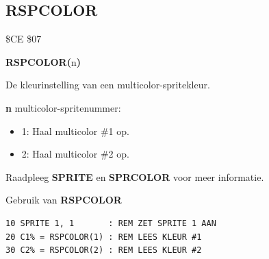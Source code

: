 \subsection{RSPCOLOR}
\begin{description}[leftmargin=2cm,style=nextline]
\item [Token:]    \$CE \$07

\item [Formaat:]   {\bf RSPCOLOR(}n{\bf)}

\item [Retourneert:]  De kleurinstelling van een multicolor-spritekleur.

                  {\bf n} multicolor-spritenummer:

                  \begin{itemize}
                     \item 1: Haal multicolor \#1 op.                     \item 2: Haal multicolor \#2 op.
                  \end{itemize}

\item [Opmerkingen:]  Raadpleeg {\bf SPRITE} en {\bf SPRCOLOR} voor meer informatie.

\item [Voorbeeld:]  Gebruik van {\bf RSPCOLOR}

\begin{tcolorbox}[colback=black,coltext=white]
\verbatimfont{\codefont}
\begin{verbatim}
10 SPRITE 1, 1       : REM ZET SPRITE 1 AAN
20 C1% = RSPCOLOR(1) : REM LEES KLEUR #1
30 C2% = RSPCOLOR(2) : REM LEES KLEUR #2
\end{verbatim}
\end{tcolorbox}
\end{description}


\newpage

